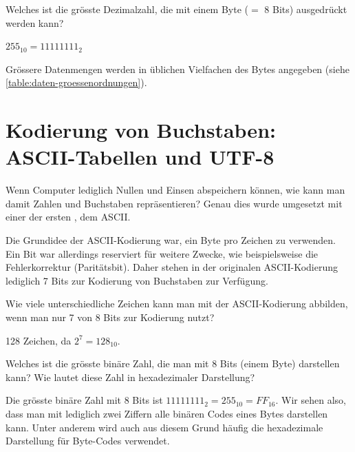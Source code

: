 \begin{myexercise}
	\label{ex:byte-max}
	Welches ist die grösste Dezimalzahl, die mit einem Byte ($=$ 8 Bits) ausgedrückt werden kann?
	\begin{myanswer}
		$255_{10} = 11111111_2$
	\end{myanswer}
\end{myexercise}

Grössere Datenmengen werden in üblichen Vielfachen des Bytes angegeben (siehe \cref{table:daten-groessenordnungen}).

\section{Kodierung von Buchstaben: ASCII-Tabellen und UTF-8}
Wenn Computer lediglich Nullen und Einsen abspeichern können, wie kann man damit Zahlen und Buchstaben repräsentieren? Genau dies wurde umgesetzt mit einer der ersten , dem \gls{ASCII}.

Die Grundidee der \gls{ASCII}-Kodierung war, ein Byte pro Zeichen zu verwenden. Ein Bit war allerdings reserviert für weitere Zwecke, wie beispielsweise die Fehlerkorrektur (Paritätsbit). Daher stehen in der originalen ASCII-Kodierung lediglich 7 Bits zur Kodierung von Buchstaben zur Verfügung.

\begin{myexercise}
	Wie viele unterschiedliche Zeichen kann man mit der ASCII-Kodierung abbilden, wenn man nur 7 von 8 Bits zur Kodierung nutzt?
	\begin{myanswer}
		128 Zeichen, da $2^7=128_{10}$.
	\end{myanswer}
\end{myexercise}
\begin{myexercise}
	Welches ist die grösste binäre Zahl, die man mit 8 Bits (einem Byte) darstellen kann? Wie lautet diese Zahl in hexadezimaler Darstellung?
	\begin{myanswer}
		Die grösste binäre Zahl mit 8 Bits ist $11111111_2 = 255_{10} = FF_{16}$. Wir sehen also, dass man mit lediglich zwei Ziffern alle binären Codes eines Bytes darstellen kann. Unter anderem wird auch aus diesem Grund häufig die hexadezimale Darstellung für Byte-Codes verwendet.
	\end{myanswer}
\end{myexercise}

